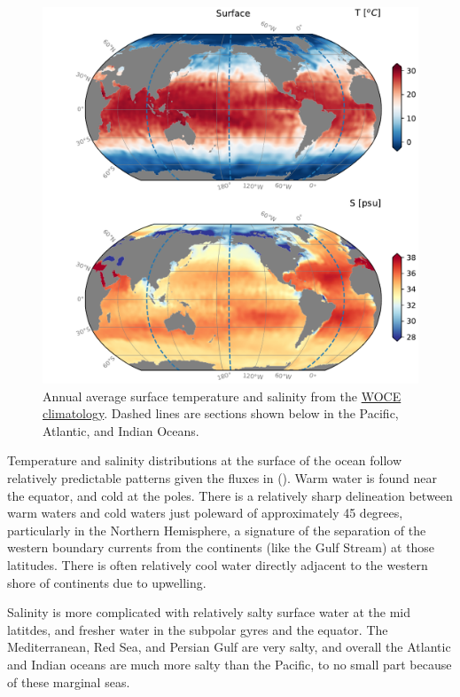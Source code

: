 \begin{figure}[hbt]
  \begin{center}
  \includegraphics{figs/WaterMasses/SurfaceTS}
    \caption{Annual average surface temperature and salinity from the \href{https://icdc.cen.uni-hamburg.de/en/woce-climatology.html}{WOCE climatology}.  Dashed lines are sections shown below in the Pacific, Atlantic, and Indian Oceans.}  
    \label{fig:SurfaceTS}  
  \end{center}
\end{figure}

Temperature and salinity distributions at the surface of the ocean follow relatively predictable patterns given the fluxes in  ().  Warm water is found near the equator, and cold at the poles.  There is a relatively sharp delineation between warm waters and cold waters just poleward of approximately 45 degrees, particularly in the Northern Hemisphere, a signature of the separation of the western boundary currents from the continents (like the Gulf Stream) at those latitudes.   There is often relatively cool water directly adjacent to the western shore of continents due to upwelling.  

Salinity is more complicated with relatively salty surface water at the mid latitdes, and fresher water in the subpolar gyres and the equator.  The Mediterranean, Red Sea, and Persian Gulf are very salty, and overall the Atlantic and Indian oceans are much more salty than the Pacific, to no small part because of these marginal seas.  


